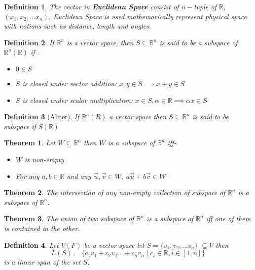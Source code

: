 \documentclass[12pt]{article}
\newcommand{\R}{\mathbb{R}}
\newtheorem{thm}{Theorem}
\newtheorem*{defn}{Definition}
\begin{document}
\begin{defn}\normalfont
	The vector in \textbf{Euclidean Space} consist of $n-$tuple of $\R$, $(x_1,x_2,\dots x_n)$, Euclidean Space is used mathemarically represent physical space with notions such as distance, length and angles.
\end{defn}

\begin{defn} \normalfont
	If $\R^n$ is a vector space, then $S \subseteq \R^n$ is said to be a subspace of $\R^n (\R)$ if - 
	\begin{itemize}
		\item $0 \in S$
		\item $S$ is closed under vector addition: $x,y \in S \implies x+y \in S$
		\item $S$ is closed under scalar multiplication: $x \in S, \alpha \in \R \implies \alpha x \in S$
	\end{itemize}
\end{defn}

\begin{defn}[Aliter]\normalfont
	If $\R^n(R)$ a vector space then $S \subseteq \R^n$ is said to be subspace if $S(\R)$
\end{defn}

\begin{thm}\normalfont
	Let $W \subseteq \R^n$ then $W$ is a subspace of $\R^n$ iff-
	\begin{itemize}
		\item $W$ is non-empty
		\item For any $a,b \in \R $ and any $\vec{u}, \vec{v} \in W,\; a\vec{u}+b\vec{v} \in W$
	\end{itemize}
\end{thm}

\begin{thm}\normalfont
	The intersection of any non-empty collection of subspace of $\R^n$ is a subspace of $\R^n$.
\end{thm}

\begin{thm}\normalfont
	The union of two subspace of $\R^n$ is a subspace of $\R^n$ iff one of them is contained in the other.
\end{thm}

\begin{defn}\normalfont
	Let $V(F)$ be a vector space let $S=\{v_1, v_2,\dots v_n\}\; \subseteq V$ then $$L(S) = \{c_1v_1+c_2v_2\dots + c_nv_n \; |\; c_i \in \R, i\in [1,n]\}$$ is a linear span of the set $S$.
\end{defn}
\end{document}
